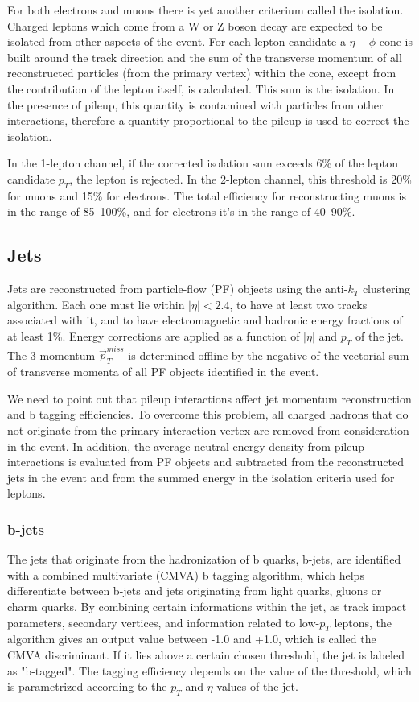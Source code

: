 \documentclass[EPJ,twocolumn]{webofc}
\begin{document}
For both electrons and muons there is yet another criterium called the isolation. Charged leptons which come from a W or Z boson decay are expected to be isolated from other aspects of the event. For each lepton candidate a $\eta-\phi$ cone is built around the track direction and the sum of the transverse momentum of all reconstructed particles (from the primary vertex) within the cone, except from the contribution of the lepton itself, is calculated. This sum is the isolation. In the presence of pileup, this quantity is contamined with particles from other interactions, therefore a quantity proportional to the pileup is used to correct the isolation.

In the 1-lepton channel, if the corrected isolation sum exceeds 6\% of the lepton candidate $p_T$, the lepton is rejected. In the 2-lepton channel, this threshold is 20\% for muons and 15\% for electrons. The total efficiency for reconstructing muons is in the
range of 85–100\%, and for electrons it's in the range of 40–90\%.

\subsection{Jets}

Jets are reconstructed from particle-flow (PF) objects using the anti-$k_T$ clustering algorithm. Each one must lie within $|\eta|<2.4$, to have at least two tracks associated with it, and to have electromagnetic and hadronic energy fractions of at least 1\%. Energy corrections are applied as a function of  $|\eta|$ and $p_T$ of the jet. The 3-momentum $\vec{p}_{T}^{miss}$ is determined offline by the negative of the vectorial sum of transverse momenta of all PF objects identified in the event.


We need to point out that pileup interactions affect jet momentum reconstruction and b tagging efficiencies. To overcome this problem, all charged hadrons that do not originate from the primary interaction vertex are removed from consideration in the event. In addition, the average neutral energy density from pileup interactions is evaluated from PF objects and subtracted from the reconstructed jets in the event and from the summed energy in the isolation criteria used for leptons.


\subsubsection*{b-jets}

The jets that originate from the hadronization of b quarks, b-jets, are identified with a combined multivariate (CMVA) b tagging algorithm, which helps differentiate between b-jets and jets originating from light quarks, gluons or charm quarks. By combining certain informations within the jet, as track impact parameters, secondary vertices, and information related to low-$p_T$ leptons, the algorithm gives an output value between -1.0 and +1.0, which is called the CMVA discriminant. If it lies above a certain chosen threshold, the jet is labeled as "b-tagged". The tagging efficiency depends on the value of the threshold, which is parametrized according to the $p_T$ and $\eta$ values of the jet.
\end{document}
